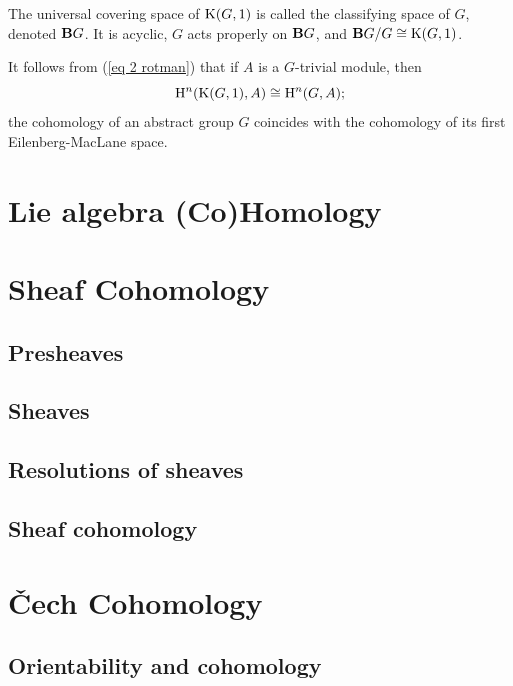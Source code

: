 \begin{defn}
    The universal covering space of $\rmK(G,1)$ is called the classifying space of $G$, denoted $\bf{B}G$. It is acyclic, $G$ acts properly on $\bf{B}G$, and $\bf{B}G\slash G\cong \rmK(G,1)$.
\end{defn}

It follows from (\ref{eq 2 rotman}) that if $A$ is a $G$-trivial module, then
\[\rmH^n(\rmK(G,1),A)\cong \rmH^n(G,A);\]
the cohomology of an abstract group $G$ coincides with the cohomology of its first Eilenberg-MacLane space.



\section{Lie algebra (Co)Homology}






\section{Sheaf Cohomology}
\subsection{Presheaves}

\subsection{Sheaves}

\subsection{Resolutions of sheaves}

\subsection{Sheaf cohomology}




\section{\v Cech Cohomology}

\subsection{Orientability and cohomology}

